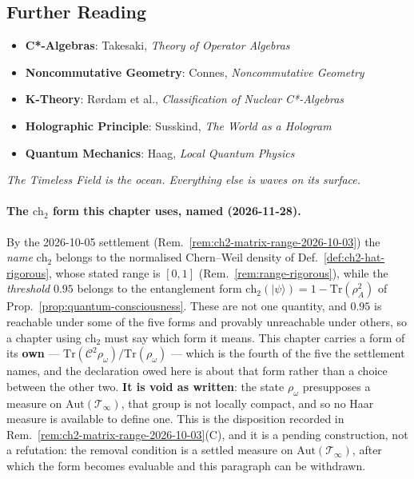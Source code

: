 \subsection{Further Reading}

\begin{itemize}
\item \textbf{C*-Algebras}: Takesaki, \textit{Theory of Operator Algebras}\cite{takesaki_theory_2002}
\item \textbf{Noncommutative Geometry}: Connes, \textit{Noncommutative Geometry}\cite{connes_noncommutative_1994}
\item \textbf{K-Theory}: Rørdam et al., \textit{Classification of Nuclear C*-Algebras}\cite{rordam_classification_2002}
\item \textbf{Holographic Principle}: Susskind, \textit{The World as a Hologram}\cite{susskind_world_1995}
\item \textbf{Quantum Mechanics}: Haag, \textit{Local Quantum Physics}\cite{haag_local_1996}
\end{itemize}

\vspace{1cm}

\begin{center}
\textit{The Timeless Field is the ocean. Everything else is waves on its surface.}
\end{center}
\paragraph{The $\text{ch}_2$ form this chapter uses, named (2026-11-28).}
By the 2026-10-05 settlement (Rem.~\ref{rem:ch2-matrix-range-2026-10-03}) the
\emph{name} $\text{ch}_2$ belongs to the normalised Chern--Weil density of
Def.~\ref{def:ch2-hat-rigorous}, whose stated range is $[0,1]$
(Rem.~\ref{rem:range-rigorous}), while the \emph{threshold} $0.95$ belongs to the
entanglement form $\text{ch}_2(|\psi\rangle) = 1 - \mathrm{Tr}(\rho_A^2)$ of
Prop.~\ref{prop:quantum-consciousness}. These are not one quantity, and $0.95$ is
reachable under some of the five forms and provably unreachable under others, so a
chapter using $\text{ch}_2$ must say which form it means.
This chapter carries a form of its \textbf{own} --- $\mathrm{Tr}(\mathcal{C}^2
\rho_\omega)/\mathrm{Tr}(\rho_\omega)$ --- which is the fourth of the five the
settlement names, and the declaration owed here is about that form rather than a
choice between the other two. \textbf{It is void as written}: the state
$\rho_\omega$ presupposes a measure on $\mathrm{Aut}(\mathcal{T}_\infty)$, that
group is not locally compact, and so no Haar measure is available to define one.
This is the disposition recorded in
Rem.~\ref{rem:ch2-matrix-range-2026-10-03}(C), and it is a pending construction,
not a refutation: the removal condition is a settled measure on
$\mathrm{Aut}(\mathcal{T}_\infty)$, after which the form becomes evaluable and
this paragraph can be withdrawn.

